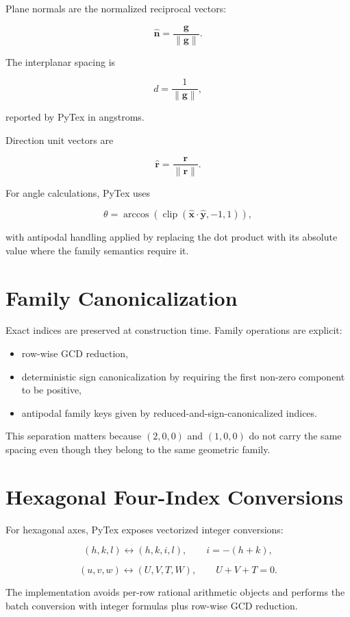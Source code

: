\documentclass[11pt]{article}
\begin{document}
Plane normals are the normalized reciprocal vectors:

\[
\hat{\mathbf{n}} = \frac{\mathbf{g}}{\lVert \mathbf{g} \rVert}.
\]

The interplanar spacing is

\[
d = \frac{1}{\lVert \mathbf{g} \rVert},
\]

reported by PyTex in angstroms.

Direction unit vectors are

\[
\hat{\mathbf{r}} = \frac{\mathbf{r}}{\lVert \mathbf{r} \rVert}.
\]

For angle calculations, PyTex uses

\[
\theta = \arccos\!\left(\operatorname{clip}(\hat{\mathbf{x}} \cdot \hat{\mathbf{y}}, -1, 1)\right),
\]

with antipodal handling applied by replacing the dot product with its absolute value where the
family semantics require it.

\section{Family Canonicalization}

Exact indices are preserved at construction time. Family operations are explicit:

\begin{itemize}
  \item row-wise GCD reduction,
  \item deterministic sign canonicalization by requiring the first non-zero component to be positive,
  \item antipodal family keys given by reduced-and-sign-canonicalized indices.
\end{itemize}

This separation matters because $(2, 0, 0)$ and $(1, 0, 0)$ do not carry the same spacing even
though they belong to the same geometric family.

\section{Hexagonal Four-Index Conversions}

For hexagonal axes, PyTex exposes vectorized integer conversions:

\[
(h, k, l) \leftrightarrow (h, k, i, l), \qquad i = -(h + k),
\]

\[
(u, v, w) \leftrightarrow (U, V, T, W), \qquad U + V + T = 0.
\]

The implementation avoids per-row rational arithmetic objects and performs the batch conversion with
integer formulas plus row-wise GCD reduction.
\end{document}

